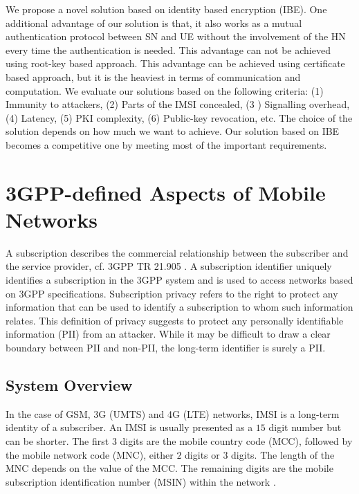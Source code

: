 \documentclass{llncs} %
\begin{document}
We propose a novel solution based on identity based encryption (IBE). One additional advantage of our solution is that, it also works as a mutual authentication protocol between SN and UE without the involvement of the HN every time the authentication is needed. This advantage can not be achieved using root-key based approach. This advantage can be achieved using certificate based approach, but it is the heaviest in terms of communication and computation. 
We evaluate our solutions based on the following criteria: (1) Immunity to attackers, (2) Parts of the IMSI concealed, (3 ) Signalling overhead, (4) Latency, (5) PKI complexity, (6) Public-key revocation, etc. The choice of the solution depends on how much we want to achieve. Our solution based on IBE becomes a competitive one by meeting most of the important requirements.

\section{3GPP-defined Aspects of Mobile Networks}
\label{sec:3GPP-defined_aspects_of_mobile_network}
A subscription describes the commercial relationship between the subscriber and the service provider, cf. 3GPP TR 21.905 \cite{TR21905}. A subscription identifier uniquely identifies a subscription in the 3GPP system and is used to access networks based on 3GPP specifications. Subscription privacy refers to the right to protect any information that can be used to identify a subscription to whom such information relates. This definition of privacy suggests to protect any personally identifiable information (PII) from an attacker. While it may be difficult to draw a clear boundary between PII and non-PII, the long-term identifier is surely a PII. 

\subsection{System Overview}
In the case of GSM, 3G (UMTS) and 4G (LTE) networks, IMSI is a long-term identity of a subscriber. An IMSI is usually presented as a $15$ digit number but can be shorter. The first $3$ digits are the mobile country code (MCC), followed by the mobile network code (MNC), either $2$ digits or $3$ digits. The length of the MNC depends on the value of the MCC. The remaining digits are the mobile subscription identification number (MSIN) within the network \cite{TS23003}. 
\end{document}
